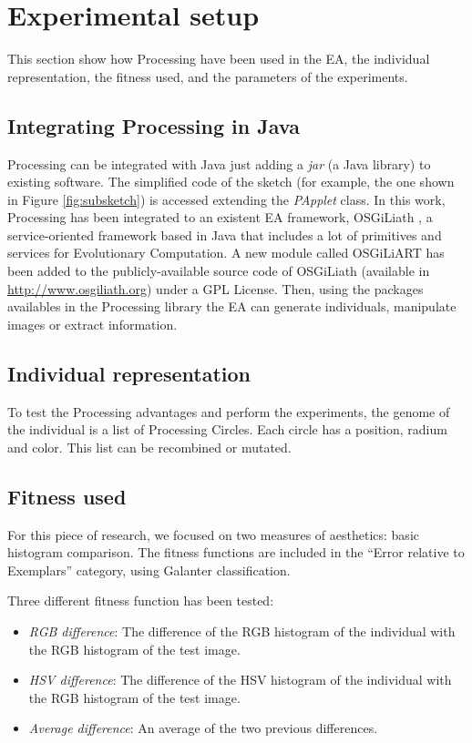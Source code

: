 \documentclass[conference]{IEEEtran}
\begin{document}
\section{Experimental setup}
\label{sec:setup}

This section show how Processing have been used in the EA, the individual representation, the fitness used, and the parameters of the experiments.

\subsection{Integrating Processing in Java}
Processing can be integrated with Java just adding a {\em jar} (a Java library) to existing software. The simplified code of the sketch (for example, the one shown in Figure \ref{fig:subsketch}) is accessed extending the {\em PApplet} class. In this work, Processing has been integrated to an existent EA framework, OSGiLiath \cite{OSGILIATH}, a service-oriented framework based in Java that includes a lot of primitives and services for Evolutionary Computation. A new module called OSGiLiART has been added to the publicly-available source code of OSGiLiath (available in \url{http://www.osgiliath.org}) under a GPL License. Then, using the packages availables in the Processing library the EA can generate individuals, manipulate images or extract information.

\subsection{Individual representation}

To test the Processing advantages and perform the experiments, the genome of the individual is a list of Processing Circles. Each circle has a position, radium and color. This list can be recombined or mutated.

\subsection{Fitness used}
For this piece of research, we focused on two measures of aesthetics: basic histogram comparison. The fitness functions are included in the ``Error relative to Exemplars'' category, using Galanter \cite{galanter2012computational} classification.

Three different fitness function has been tested:
\begin{itemize}
\item {\em RGB difference}: The difference of the RGB histogram of the individual with the RGB histogram of the test image.
\item {\em HSV difference}: The difference of the HSV histogram of the individual with the RGB histogram of the test image.
\item {\em Average difference}: An average of the two previous differences.
\end{itemize}
\end{document}
